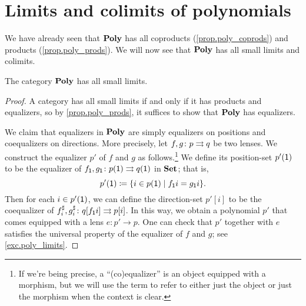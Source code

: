 \documentclass[Book-Poly]{subfiles}
\begin{document}
\section{Limits and colimits of polynomials}

We have already seen that $\mathbf{Poly}$ has all coproducts (\cref{prop.poly_coprods}) and products (\cref{prop.poly_prods}).
We will now see that $\mathbf{Poly}$ has all small limits and colimits.

\begin{theorem}\label{thm.poly_limits}
The category $\mathbf{Poly}$ has all small limits.
\end{theorem}
\begin{proof}
A category has all small limits if and only if it has products and equalizers, so by \cref{prop.poly_prods}, it suffices to show that $\mathbf{Poly}$ has equalizers.

We claim that equalizers in $\mathbf{Poly}$ are simply equalizers on positions and coequalizers on directions.
More precisely, let $f,g \colon p \rightrightarrows q$ be two lenses.
We construct the equalizer $p'$ of $f$ and $g$ as follows.\footnote{If we're being precise, a ``(co)equalizer'' is an object equipped with a morphism, but we will use the term to refer to either just the object or just the morphism when the context is clear.}
We define its position-set $p'(\textsf{1})$ to be the equalizer of $f_{\textsf{1}},g_{\textsf{1}} \colon p(\textsf{1}) \rightrightarrows q(\textsf{1})$ in $\mathbf{Set}$; that is,
\[
    p'(\textsf{1}) \coloneqq \{i \in p(\textsf{1}) \mid f_{\textsf{1}}i = g_{\textsf{1}}i\}.
\]
Then for each $i \in p'(\textsf{1})$, we can define the direction-set $p'[i]$ to be the coequalizer of $f^\sharp_i, g^\sharp_i \colon q[f_{\textsf{1}}i] \rightrightarrows p[i]$.
In this way, we obtain a polynomial $p'$ that comes equipped with a lens $e \colon p' \to p$.
One can check that $p'$ together with $e$ satisfies the universal property of the equalizer of $f$ and $g$; see \cref{exc.poly_limits}.
\end{proof}
\end{document}
